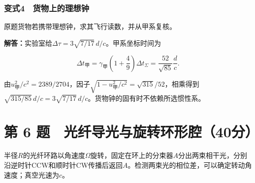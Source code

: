 \documentclass[12pt,a4paper,fontset=fandol]{ctexart}
\begin{document}
\subsubsection{变式4　货物上的理想钟}\label{ux53d8ux5f0f4-ux8d27ux7269ux4e0aux7684ux7406ux60f3ux949f}

原题货物若携带理想钟，求其飞行读数，并从甲系复核。

\textbf{解答：}实验室给\(\Delta\tau=3\sqrt{7/17}\,d/c\)。甲系坐标时间为

\[
\Delta t_\text{甲}
=\gamma_\text{甲}
\left(1+\frac49\right)\Delta t_\Sigma
=\frac{52}{\sqrt{85}}\frac dc.
\]

由\(u_\text{甲}^2/c^2=2389/2704\)，因子\(\sqrt{1-u_\text{甲}^2/c^2}=\sqrt{315}/52\)，相乘得到\(\sqrt{315/85}\,d/c=3\sqrt{7/17}\,d/c\)。货物钟的固有时不依赖所选惯性系。

\clearpage

\section{第 6
题　光纤导光与旋转环形腔（40分）}\label{ux7b2c-6-ux9898-ux5149ux7ea4ux5bfcux5149ux4e0eux65cbux8f6cux73afux5f62ux815440ux5206}

半径\(R\)的光纤环路以角速度\(\Omega\)旋转，固定在环上的分束器\(A\)分出两束相干光，分别沿逆时针CCW和顺时针CW传播后返回\(A\)。检测两束光的相位差，可以确定转动角速度；真空光速为\(c\)。

\begin{center}
\begin{minipage}{\linewidth}
\centering\begingroup{}
\ifdim\wd\diagrambox>.88\linewidth
\sbox{\diagrambox}{\resizebox{.88\linewidth}{!}{\usebox{\diagrambox}}}\fi
\ifdim\ht\diagrambox>.38\textheight
\resizebox{!}{.38\textheight}{\usebox{\diagrambox}}
\else\usebox{\diagrambox}\fi
\par{}\endgroup\end{minipage}\end{center}
\end{document}
